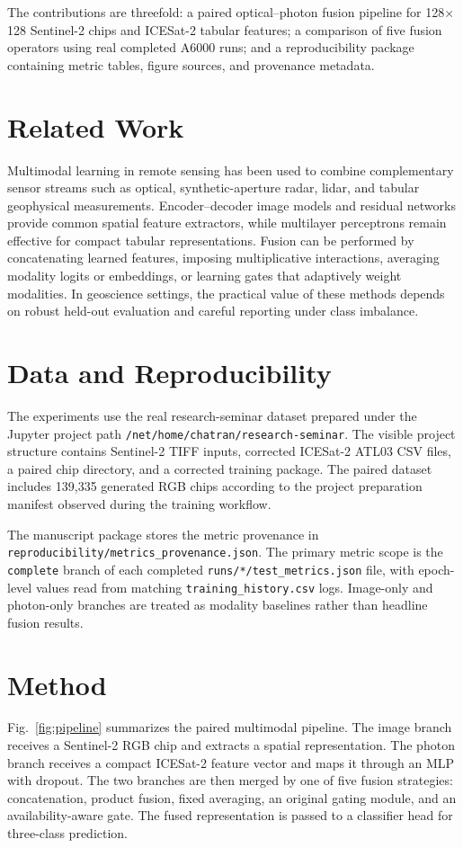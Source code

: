 \documentclass[journal]{IEEEtran}
\begin{document}
The contributions are threefold: a paired optical--photon fusion pipeline for 128$\times$128 Sentinel-2 chips and ICESat-2 tabular features; a comparison of five fusion operators using real completed A6000 runs; and a reproducibility package containing metric tables, figure sources, and provenance metadata.

\section{Related Work}
Multimodal learning in remote sensing has been used to combine complementary sensor streams such as optical, synthetic-aperture radar, lidar, and tabular geophysical measurements. Encoder--decoder image models and residual networks provide common spatial feature extractors, while multilayer perceptrons remain effective for compact tabular representations. Fusion can be performed by concatenating learned features, imposing multiplicative interactions, averaging modality logits or embeddings, or learning gates that adaptively weight modalities. In geoscience settings, the practical value of these methods depends on robust held-out evaluation and careful reporting under class imbalance.

\section{Data and Reproducibility}
The experiments use the real research-seminar dataset prepared under the Jupyter project path \texttt{/net/home/chatran/research-seminar}. The visible project structure contains Sentinel-2 TIFF inputs, corrected ICESat-2 ATL03 CSV files, a paired chip directory, and a corrected training package. The paired dataset includes 139,335 generated RGB chips according to the project preparation manifest observed during the training workflow.

The manuscript package stores the metric provenance in \texttt{reproducibility/metrics\_provenance.json}. The primary metric scope is the \texttt{complete} branch of each completed \texttt{runs/*/test\_metrics.json} file, with epoch-level values read from matching \texttt{training\_history.csv} logs. Image-only and photon-only branches are treated as modality baselines rather than headline fusion results.

\section{Method}
Fig.~\ref{fig:pipeline} summarizes the paired multimodal pipeline. The image branch receives a Sentinel-2 RGB chip and extracts a spatial representation. The photon branch receives a compact ICESat-2 feature vector and maps it through an MLP with dropout. The two branches are then merged by one of five fusion strategies: concatenation, product fusion, fixed averaging, an original gating module, and an availability-aware gate. The fused representation is passed to a classifier head for three-class prediction.
\end{document}
